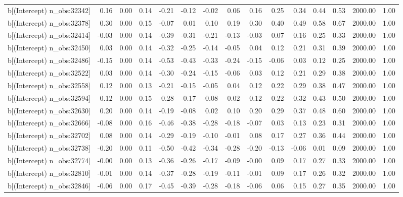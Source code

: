 \begin{table}[ht]
\begin{tabular}{rrrrrrrrrrrrrrr}
  b[(Intercept) n\_obs:32342] & 0.16 & 0.00 & 0.14 & -0.21 & -0.12 & -0.02 & 0.06 & 0.16 & 0.25 & 0.34 & 0.44 & 0.53 & 2000.00 & 1.00 \\ 
  b[(Intercept) n\_obs:32378] & 0.30 & 0.00 & 0.15 & -0.07 & 0.01 & 0.10 & 0.19 & 0.30 & 0.40 & 0.49 & 0.58 & 0.67 & 2000.00 & 1.00 \\ 
  b[(Intercept) n\_obs:32414] & -0.03 & 0.00 & 0.14 & -0.39 & -0.31 & -0.21 & -0.13 & -0.03 & 0.07 & 0.16 & 0.25 & 0.33 & 2000.00 & 1.00 \\ 
  b[(Intercept) n\_obs:32450] & 0.03 & 0.00 & 0.14 & -0.32 & -0.25 & -0.14 & -0.05 & 0.04 & 0.12 & 0.21 & 0.31 & 0.39 & 2000.00 & 1.00 \\ 
  b[(Intercept) n\_obs:32486] & -0.15 & 0.00 & 0.14 & -0.53 & -0.43 & -0.33 & -0.24 & -0.15 & -0.06 & 0.03 & 0.12 & 0.25 & 2000.00 & 1.00 \\ 
  b[(Intercept) n\_obs:32522] & 0.03 & 0.00 & 0.14 & -0.30 & -0.24 & -0.15 & -0.06 & 0.03 & 0.12 & 0.21 & 0.29 & 0.38 & 2000.00 & 1.00 \\ 
  b[(Intercept) n\_obs:32558] & 0.12 & 0.00 & 0.13 & -0.21 & -0.15 & -0.05 & 0.04 & 0.12 & 0.22 & 0.29 & 0.38 & 0.47 & 2000.00 & 1.00 \\ 
  b[(Intercept) n\_obs:32594] & 0.12 & 0.00 & 0.15 & -0.28 & -0.17 & -0.08 & 0.02 & 0.12 & 0.22 & 0.32 & 0.43 & 0.50 & 2000.00 & 1.00 \\ 
  b[(Intercept) n\_obs:32630] & 0.20 & 0.00 & 0.14 & -0.19 & -0.08 & 0.02 & 0.10 & 0.20 & 0.29 & 0.37 & 0.48 & 0.60 & 2000.00 & 1.00 \\ 
  b[(Intercept) n\_obs:32666] & -0.08 & 0.00 & 0.16 & -0.46 & -0.38 & -0.28 & -0.18 & -0.07 & 0.03 & 0.13 & 0.23 & 0.31 & 2000.00 & 1.00 \\ 
  b[(Intercept) n\_obs:32702] & 0.08 & 0.00 & 0.14 & -0.29 & -0.19 & -0.10 & -0.01 & 0.08 & 0.17 & 0.27 & 0.36 & 0.44 & 2000.00 & 1.00 \\ 
  b[(Intercept) n\_obs:32738] & -0.20 & 0.00 & 0.11 & -0.50 & -0.42 & -0.34 & -0.28 & -0.20 & -0.13 & -0.06 & 0.01 & 0.09 & 2000.00 & 1.00 \\ 
  b[(Intercept) n\_obs:32774] & -0.00 & 0.00 & 0.13 & -0.36 & -0.26 & -0.17 & -0.09 & -0.00 & 0.09 & 0.17 & 0.27 & 0.33 & 2000.00 & 1.00 \\ 
  b[(Intercept) n\_obs:32810] & -0.01 & 0.00 & 0.14 & -0.37 & -0.28 & -0.19 & -0.11 & -0.01 & 0.09 & 0.17 & 0.26 & 0.32 & 2000.00 & 1.00 \\ 
  b[(Intercept) n\_obs:32846] & -0.06 & 0.00 & 0.17 & -0.45 & -0.39 & -0.28 & -0.18 & -0.06 & 0.06 & 0.15 & 0.27 & 0.35 & 2000.00 & 1.00 \\ 

\end{tabular}
\end{table}
